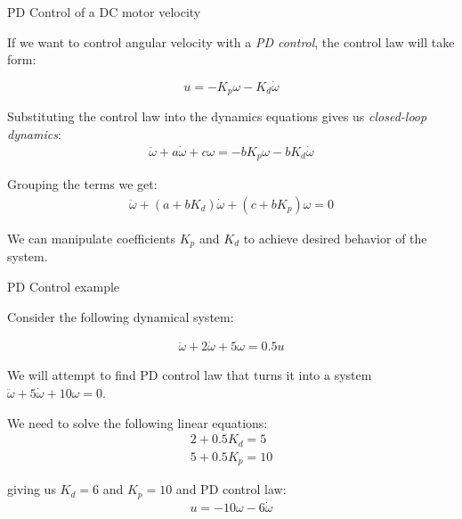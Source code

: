 \documentclass{beamer}
\begin{document}
\begin{frame}{PD Control of a DC motor velocity}
	\begin{flushleft}
		
		If we want to control angular velocity with a \emph{PD control}, the control law will take form:
		
		\begin{equation}
			u = - K_p \omega - K_d \dot \omega
		\end{equation}
	
		Substituting the control law into the dynamics equations gives us \emph{closed-loop dynamics}:
		\begin{align}
			\ddot \omega  + a\dot \omega  + c\omega =
			- b K_p \omega - b K_d \dot \omega 
		\end{align}
		
		Grouping the terms we get:
		\begin{align}
			\ddot \omega  + (a + b K_d)\dot \omega  + (c + b K_p)\omega = 0
		\end{align}
		
		We can manipulate coefficients $K_p$ and $K_d$ to achieve desired behavior of the system.
		
	\end{flushleft}
\end{frame}



\begin{frame}{PD Control example}
	\begin{flushleft}
		
		Consider the following dynamical system:
		
		\begin{align}
			\ddot \omega  + 2 \dot \omega  + 5\omega = 0.5 u
		\end{align}
		
		We will attempt to find PD control law that turns it into a system $\ddot \omega  + 5 \dot \omega  + 10\omega = 0$.
		
		\bigskip
		
		We need to solve the following linear equations:
		\begin{align}
			2 + 0.5 K_d = 5 \\
			5 + 0.5 K_p = 10
		\end{align}
		
		giving us $K_d = 6$ and $K_p = 10$ and PD control law:
		\begin{align}
			u = - 10 \omega - 6 \dot \omega
		\end{align}
		
	\end{flushleft}
\end{frame}
\end{document}
